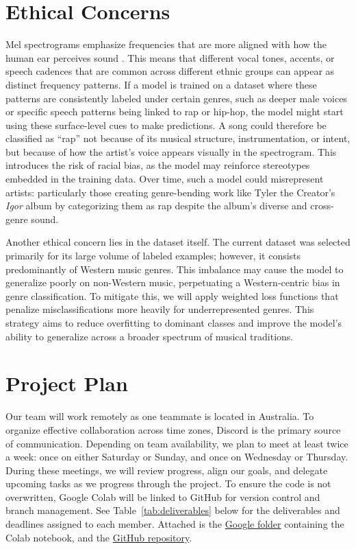 \documentclass{article} %
\begin{document}
\section{Ethical Concerns}

Mel spectrograms emphasize frequencies that are more aligned with how the human ear perceives sound \citep{landschoot2020github}. This means that different vocal tones, accents, or speech cadences that are common across different ethnic groups can appear as distinct frequency patterns. If a model is trained on a dataset where these patterns are consistently labeled under certain genres, such as deeper male voices or specific speech patterns being linked to rap or hip-hop, the model might start using these surface-level cues to make predictions. A song could therefore be classified as “rap” not because of its musical structure, instrumentation, or intent, but because of how the artist’s voice appears visually in the spectrogram. This introduces the risk of racial bias, as the model may reinforce stereotypes embedded in the training data. Over time, such a model could misrepresent artists: particularly those creating genre-bending work like Tyler the Creator’s \textit{Igor} album by categorizing them as rap despite the album’s diverse and cross-genre sound.

Another ethical concern lies in the dataset itself. The current dataset was selected primarily for its large volume of labeled examples; however, it consists predominantly of Western music genres. This imbalance may cause the model to generalize poorly on non-Western music, perpetuating a Western-centric bias in genre classification. To mitigate this, we will apply weighted loss functions that penalize misclassifications more heavily for underrepresented genres. This strategy aims to reduce overfitting to dominant classes and improve the model’s ability to generalize across a broader spectrum of musical traditions.


\section{Project Plan}

Our team will work remotely as one teammate is located in Australia. To organize effective collaboration across time zones, Discord is the primary source of communication. Depending on team availability, we plan to meet at least twice a week: once on either Saturday or Sunday, and once on Wednesday or Thursday. During these meetings, we will review progress, align our goals, and delegate upcoming tasks as we progress through the project. To ensure the code is not overwritten, Google Colab will be linked to GitHub for version control and branch management. See Table~\ref{tab:deliverables} below for the deliverables and deadlines assigned to each member. Attached is the \href{https://drive.google.com/drive/folders/1QGxYpoasWKFKUcYMxIBiFAGk11h4XRYb?usp=sharing}{Google folder} containing the Colab notebook, and the \href{https://github.com/TangALE/Music_Genre_Classification}{GitHub repository}.
\end{document}
